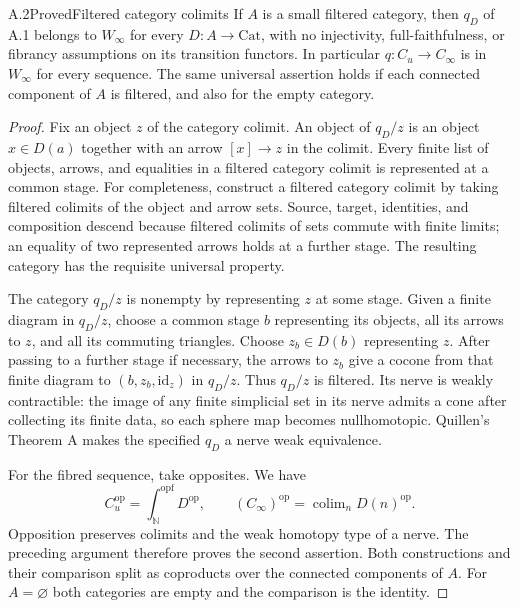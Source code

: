 \begin{result}{A.2}{Proved}{Filtered category colimits}
If $A$ is a small filtered category, then $q_D$ of A.1 belongs to
$W_\infty$ for every $D:A\to\mathrm{Cat}$, with no injectivity,
full-faithfulness, or fibrancy assumptions on its transition functors.
In particular $q:C_u\to C_\infty$ is in $W_\infty$ for every sequence.
The same universal assertion holds if each connected component of $A$
is filtered, and also for the empty category.
\end{result}
\begin{proof}
Fix an object $z$ of the category colimit. An object of $q_D/z$ is an
object $x\in D(a)$ together with an arrow $[x]\to z$ in the colimit.
Every finite list of objects, arrows, and equalities in a filtered
category colimit is represented at a common stage. For completeness,
construct a filtered category colimit by taking filtered colimits of
the object and arrow sets. Source, target, identities, and composition
descend because filtered colimits of sets commute with finite limits;
an equality of two represented arrows holds at a further stage.
The resulting category has the requisite universal property.

The category $q_D/z$ is nonempty by representing $z$ at some stage.
Given a finite diagram in $q_D/z$, choose a common stage $b$ representing
its objects, all its arrows to $z$, and all its commuting triangles.
Choose $z_b\in D(b)$ representing $z$. After passing to a further
stage if necessary, the arrows to $z_b$ give a cocone from that finite
diagram to $(b,z_b,\mathrm{id}_z)$ in $q_D/z$. Thus $q_D/z$ is filtered.
Its nerve is weakly contractible: the image of any finite simplicial
set in its nerve admits a cone after collecting its finite data, so
each sphere map becomes nullhomotopic. Quillen's Theorem A
\citep[Example 7.2.3.3, applied also to opposites]{ALurie2026} makes the
specified $q_D$ a nerve weak equivalence.

For the fibred sequence, take opposites. We have
\[
 C_u^{\mathrm{op}}=\int_{\mathbb N}^{\mathrm{opf}}D^{\mathrm{op}},
 \qquad
 (C_\infty)^{\mathrm{op}}
       =\operatorname{colim}_{n}D(n)^{\mathrm{op}}.
\]
Opposition preserves colimits and the weak homotopy type of a nerve.
The preceding argument therefore proves the second assertion. Both
constructions and their comparison split as coproducts over the
connected components of $A$. For $A=\varnothing$ both categories are
empty and the comparison is the identity.
\end{proof}

